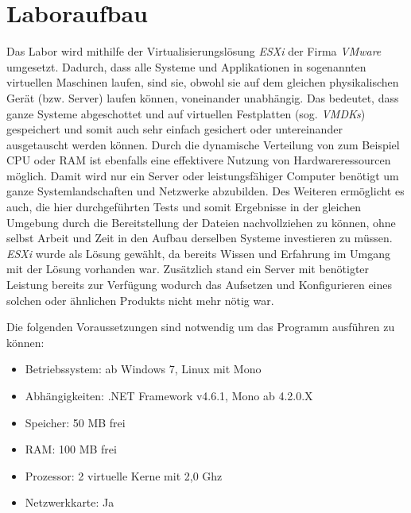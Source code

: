 \section{Laboraufbau} \label{Laboraufbau}
    Das Labor wird mithilfe der Virtualisierungslösung \emph{ESXi} %
    der Firma \emph{VMware} umgesetzt. Dadurch, dass alle Systeme und Applikationen in sogenannten virtuellen Maschinen laufen, sind sie, obwohl sie auf dem gleichen physikalischen Gerät (bzw. Server) laufen können, voneinander unabhängig. Das bedeutet, dass ganze Systeme abgeschottet und auf virtuellen Festplatten (sog. \emph{\acp{VMDK}}) gespeichert und somit auch sehr einfach gesichert oder untereinander ausgetauscht werden können. Durch die dynamische Verteilung von zum Beispiel \ac{CPU} oder \ac{RAM} ist ebenfalls eine effektivere Nutzung von Hardwareressourcen möglich. Damit wird nur ein Server oder leistungsfähiger Computer benötigt um ganze Systemlandschaften und Netzwerke abzubilden. Des Weiteren ermöglicht es auch, die hier durchgeführten Tests und somit Ergebnisse in der gleichen Umgebung durch die Bereitstellung der Dateien nachvollziehen zu können, ohne selbst Arbeit und Zeit in den Aufbau derselben Systeme investieren zu müssen.
    \emph{ESXi} wurde als Lösung gewählt, da bereits Wissen und Erfahrung im Umgang mit der Lösung vorhanden war. Zusätzlich stand ein Server mit benötigter Leistung bereits zur Verfügung wodurch das Aufsetzen und Konfigurieren eines solchen oder ähnlichen Produkts nicht mehr nötig war.
    
    Die folgenden Voraussetzungen sind notwendig um das Programm ausführen zu können:
    \begin{itemize}
        \item Betriebssystem: ab Windows 7, Linux mit Mono
        \item Abhängigkeiten: .NET Framework v4.6.1, Mono ab 4.2.0.X
        \item Speicher: 50 \ac{MB} frei
        \item RAM: 100 \ac{MB} frei
        \item Prozessor: 2 virtuelle Kerne  mit 2,0 Ghz
        \item Netzwerkkarte: Ja
    \end{itemize}
    
